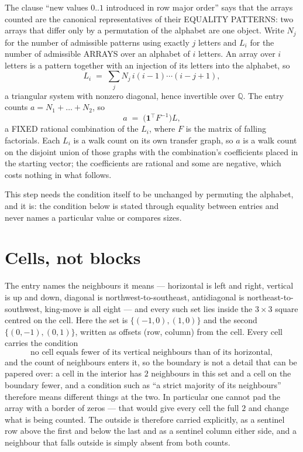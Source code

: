 \documentclass[11pt,a4paper]{article}
\theoremstyle{plain}
\theoremstyle{definition}
\begin{document}
The clause ``new values $0..1$ introduced in row major order'' says that the arrays
counted are the canonical representatives of their EQUALITY PATTERNS: two arrays that differ
only by a permutation of the alphabet are one object. Write $N_j$ for the number of admissible
patterns using exactly $j$ letters and $L_i$ for the number of admissible ARRAYS over an
alphabet of $i$ letters. An array over $i$ letters is a pattern together with an injection of
its letters into the alphabet, so
\[
L_i\;=\;\sum_{j}N_j\,i(i-1)\cdots(i-j+1),
\]
a triangular system with nonzero diagonal, hence invertible over $\mathbb{Q}$. The entry
counts $a=N_1+\dots+N_{2}$, so
\[
a\;=\;\bigl(\mathbf{1}^{\!\top}F^{-1}\bigr)L ,
\]
a FIXED rational combination of the $L_i$, where $F$ is the matrix of falling factorials.
Each $L_i$ is a walk count on its own transfer graph, so $a$ is a walk count on the disjoint
union of those graphs with the combination's coefficients placed in the starting vector; the
coefficients are rational and some are negative, which costs nothing in what follows.

This step needs the condition itself to be unchanged by permuting the alphabet, and it is:
the condition below is stated through equality between entries and never names a particular
value or compares sizes.

\section{Cells, not blocks}

The entry names the neighbours it means --- horizontal is left and right, vertical is up and
down, diagonal is northwest-to-southeast, antidiagonal is northeast-to-southwest, king-move is
all eight --- and every such set lies inside the $3\times3$ square centred on the cell. Here
the set is $\{(-1,0), (1,0)\}$ and the second $\{(0,-1), (0,1)\}$, written as offsets (row, column) from the cell. Every cell carries
the condition
\[
\text{no cell equals fewer of its vertical neighbours than of its horizontal},
\]
and the count of neighbours enters it, so the boundary is not a detail that can be papered
over: a cell in the interior has $2$ neighbours in this set and a cell on the boundary
fewer, and a condition such as ``a strict majority of its neighbours'' therefore means
different things at the two. In particular one cannot pad the array with a border of zeros ---
that would give every cell the full $2$ and change what is being counted. The outside is
therefore carried
explicitly, as a sentinel row above the first and below the last and as a sentinel column
either side, and a neighbour that falls outside is simply absent from both counts.
\end{document}
